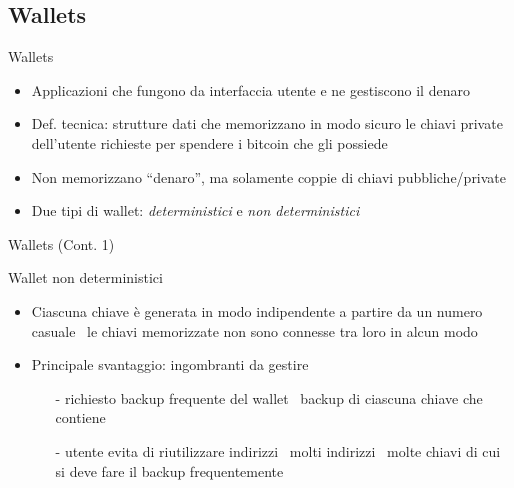 \documentclass{beamer}
\begin{document}
  \subsection{Wallets}
  \begin{frame}{Wallets}
    \begin{itemize}
      \item Applicazioni che fungono da interfaccia utente e ne gestiscono il denaro 
      \item Def. tecnica: strutture dati che memorizzano in modo sicuro le chiavi private dell'utente richieste per spendere i bitcoin che gli possiede 
      \item Non memorizzano ``denaro'', ma solamente coppie di chiavi pubbliche/private
      \item Due tipi di wallet: \emph{deterministici} e \emph{non deterministici}
    \end{itemize}
  \end{frame}




  \begin{frame}{Wallets (Cont. 1)}
    \begin{block}{Wallet non deterministici}
      \begin{itemize}
        \item Ciascuna chiave è generata in modo indipendente a partire da un numero casuale \MVRightarrow\, le chiavi memorizzate non sono connesse tra loro in alcun modo
        \item Principale svantaggio: ingombranti da gestire
        \begin{itemize}
          \item[-] richiesto backup frequente del wallet \MVRightarrow\, backup di ciascuna chiave che contiene 
          \item[-] utente evita di riutilizzare indirizzi \MVRightarrow\, molti indirizzi \MVRightarrow\, molte chiavi di cui si deve fare il backup frequentemente
        \end{itemize}
      \end{itemize}
    \end{block}
  \end{frame}
\end{document}
